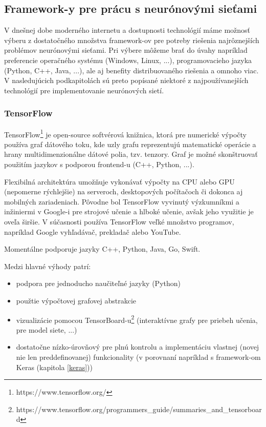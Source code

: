 \subsection{Framework-y pre prácu s neurónovými sieťami}
V dnešnej dobe moderného internetu a dostupnosti technológií máme možnosť výberu z dostatočného množstva framework-ov pre potreby riešenia najrôznejších problémov neurónovými sieťami. Pri výbere môžeme brať do úvahy napríklad preferencie operačného systému (Windows, Linux, ...), programovacieho jazyka (Python, C++, Java, ...), ale aj benefity distribuovaného riešenia a omnoho viac. V nasledujúcich podkapitolách sú preto popísané niektoré z najpoužívanejších technológií pre implementovanie neurónových sietí. 

\subsubsection{TensorFlow}
\label{tf}
TensorFlow\footnote{https://www.tensorflow.org/} je open-source softvérová knižnica, ktorá pre numerické výpočty používa graf dátového toku, kde uzly grafu reprezentujú matematické operácie a hrany multidimenzionálne dátové polia, tzv. tenzory. Graf je možné skonštruovať použitím jazykov s podporou frontend-u (C++, Python, ...). 

Flexibilná architektúra umožňuje vykonávať výpočty na CPU alebo GPU (nepomerne rýchlejšie) na serveroch, desktopových počítačoch či dokonca aj mobilných zariadeniach. Pôvodne bol TensorFlow vyvinutý výzkumníkmi a inžiniermi v Google-i pre strojové učenie a hlboké učenie, avšak jeho využitie je oveľa širšie. V súčasnosti používa TensorFlow veľké množstvo programov, napríklad Google vyhľadávač, prekladač alebo YouTube. 

Momentálne podporuje jazyky C++, Python, Java, Go, Swift.

Medzi hlavné výhody patrí:
\begin{itemize}
	\item podpora pre jednoducho naučiteľné jazyky (Python)
	\item použtie výpočtovej grafovej abstrakcie
	\item vizualizácie pomocou TensorBoard-u\footnote{https://www.tensorflow.org/programmers\_guide/summaries\_and\_tensorboard} (interaktívne grafy pre priebeh učenia, pre model siete, ...)
	\item dostatočne nízko-úrovňový pre plnú kontrolu a implementáciu vlastnej (novej nie len preddefinovanej) funkcionality (v porovnaní napríklad s framework-om Keras (kapitola \ref{keras}))
\end{itemize}


